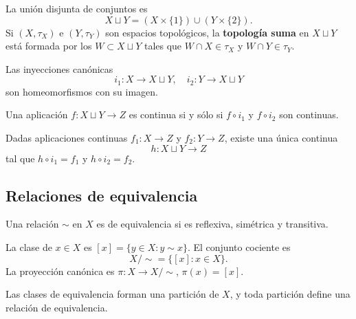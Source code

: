 \begin{definición}
    La unión disjunta de conjuntos es
    $$X\sqcup Y=(X\times\{1\})\cup(Y\times\{2\}).$$
    Si $(X,\tau_X)$ e $(Y,\tau_Y)$ son espacios topológicos, la \textbf{topología suma} en $X\sqcup Y$ está formada por los $W\subset X\sqcup Y$ tales que $W\cap X\in\tau_X$ y $W\cap Y\in\tau_Y$.
\end{definición}

\begin{proposición}
    Las inyecciones canónicas
    $$i_1:X\to X\sqcup Y,\quad i_2:Y\to X\sqcup Y$$
    son homeomorfismos con su imagen.
\end{proposición}

\begin{proposición}
    Una aplicación $f:X\sqcup Y\to Z$ es continua si y sólo si $f\circ i_1$ y $f\circ i_2$ son continuas.
\end{proposición}

\begin{proposición}
    Dadas aplicaciones continuas $f_1:X\to Z$ y $f_2:Y\to Z$, existe una única continua
    $$h:X\sqcup Y\to Z$$
    tal que $h\circ i_1=f_1$ y $h\circ i_2=f_2$.
\end{proposición}


\subsection{Relaciones de equivalencia}

\begin{definición}
    Una relación $\sim$ en $X$ es de equivalencia si es reflexiva, simétrica y transitiva.
\end{definición}

\begin{definición}
    La clase de $x\in X$ es $[x]=\{y\in X:y\sim x\}$. El conjunto cociente es
    $$X/\sim=\{[x]:x\in X\}.$$
    La proyección canónica es $\pi:X\to X/\sim$, $\pi(x)=[x]$.
\end{definición}

\begin{proposición}
    Las clases de equivalencia forman una partición de $X$, y toda partición define una relación de equivalencia.
\end{proposición}

